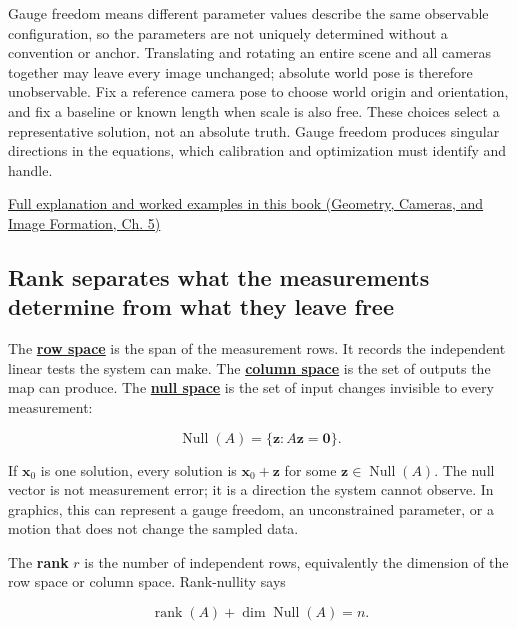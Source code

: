 Gauge freedom means different parameter values describe the same observable configuration, so the parameters are not uniquely determined without a convention or anchor. Translating and rotating an entire scene and all cameras together may leave every image unchanged; absolute world pose is therefore unobservable. Fix a reference camera pose to choose world origin and orientation, and fix a baseline or known length when scale is also free. These choices select a representative solution, not an absolute truth. Gauge freedom produces singular directions in the equations, which calibration and optimization must identify and handle.

\href{../03-Geometry-Cameras-and-Image-Formation/main.pdf\#nameddest=02-foundations-ii-ch036-calibration-needs-informative-observations-and-a-fixed-gauge}{Full explanation and worked examples in this book (Geometry, Cameras, and Image Formation, Ch. 5)}

\subsection{Rank separates what the measurements determine from what they leave free}\label{01-foundations-i-ch019-rank-separates-what-the-measurements-determine-from-what-they-leave-free}

The \textbf{\hyperref[01-foundations-i-ch019-a-system-is-an-intersection-of-constraints]{row space}} is the span of the measurement rows. It records the independent linear tests the system can make. The \textbf{\hyperref[01-foundations-i-ch019-a-system-is-an-intersection-of-constraints]{column space}} is the set of outputs the map can produce. The \textbf{\hyperref[01-foundations-i-ch019-a-system-is-an-intersection-of-constraints]{null space}} is the set of input changes invisible to every measurement:

\[
\operatorname{Null}(A)=\{\mathbf z:A\mathbf z=\mathbf0\}.
\]

If \(\mathbf x_0\) is one solution, every solution is \(\mathbf x_0+\mathbf z\) for some \(\mathbf z\in\operatorname{Null}(A)\). The null vector is not measurement error; it is a direction the system cannot observe. In graphics, this can represent a gauge freedom, an unconstrained parameter, or a motion that does not change the sampled data.

The \textbf{rank} \(r\) is the number of independent rows, equivalently the dimension of the row space or column space. Rank-nullity says

\[
\operatorname{rank}(A)+\dim\operatorname{Null}(A)=n.
\]

